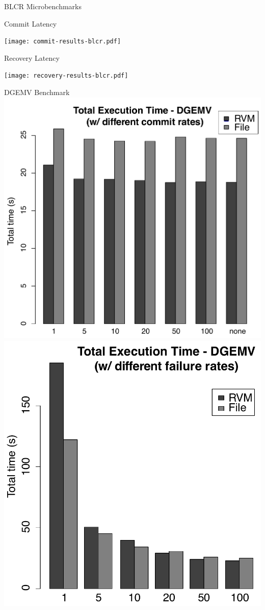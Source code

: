 \documentclass{beamer}
\begin{document}
\begin{frame}{BLCR Microbenchmarks}
    \centering
    \begin{minipage}{0.45\textwidth}
        \centering
        Commit Latency

        \texttt{[image: commit-results-blcr.pdf]}
    \end{minipage}
    \begin{minipage}{0.45\textwidth}
        \centering
        Recovery Latency

        \texttt{[image: recovery-results-blcr.pdf]}
    \end{minipage}
\end{frame}

\begin{frame}{DGEMV Benchmark}
    \centering
    \includegraphics[scale=0.25]{dgemv_total_time_commit.pdf}
    \includegraphics[scale=0.25]{dgemv_total_time_fail.pdf}

\end{frame}
\end{document}
